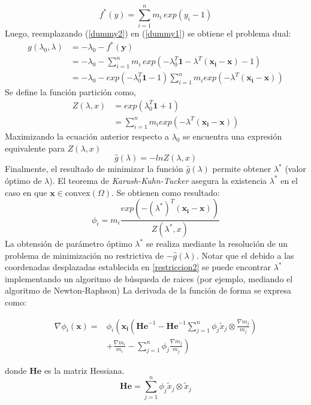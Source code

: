 \begin{equation}
f^*( y ) = \sum_{i=1}^{n} m_i \, exp(y_i-1)
\end{equation}
Luego, reemplazando (\ref{dummy2}) en (\ref{dummy1}) se obtiene el problema dual:
\begin{align}
g(\lambda_0,\lambda) & = -\lambda_0 - f^*(\bm{y}) \\
& = -\lambda_0 -\sum_{i=1}^{n} m_i \, exp(-\lambda_0^T \bm{1} - \lambda^T (\bm{x_i}-\bm{x})-1) \\
& = -\lambda_0 -exp(-\lambda_0^T \bm{1} -1) \sum_{i=1}^{n} m_i exp(-\lambda^T (\bm{x_i}-\bm{x}))
\end{align}
Se define la función partición como,
\begin{align}
Z(\lambda,x) & = exp(\lambda_0^T \bm{1} +1) \\
& = \sum_{i=1}^{n} m_i exp(-\lambda^T (\bm{x_i}-\bm{x}))
\end{align}
Maximizando la ecuación anterior respecto a $\lambda_0$ se encuentra una expresión equivalente para $Z(\lambda,x)$
\begin{equation}
\hat{g}(\lambda) = - lnZ(\lambda,x)
\end{equation}
Finalmente, el resultado de minimizar la función $\hat{g}(\lambda)$ permite obtener $\lambda^*$ (valor óptimo de $\lambda$). El teorema de \textit{Karush-Kuhn-Tucker} \citep{opt-convx} asegura la existencia $\lambda^*$ en el caso en que $\bm{x} \in \mbox{convex}(\Omega)$. Se obtienen como resultado:
\begin{equation}
\phi_i = m_i \frac{exp(-(\lambda^*)^T(\bm{x_i}-\bm{x}))}{Z(\lambda^*,x)}
\end{equation}
La obtensión de parámetro óptimo $\lambda^*$ se realiza mediante la resolución de un problema de minimización no restrictiva de $-\hat{g}(\lambda)$. Notar que el debido a las coordenadas desplazadas establecida en \ref{restriccion2} se puede encontrar $\lambda^*$ implementando un algoritmo de búsqueda de raices (por ejemplo, mediando el algoritmo de Newton-Raphson) \citep{marchant}
La derivada de la función de forma se expresa como:

\begin{footnotesize}
\begin{equation}
\begin{split}
\nabla \phi_i(\bm{x}) = &  \phi_i 
\left(
\bm{x_i} \left( \bm{He}^{-1} - \bm{He}^{-1} \sum_{j=1}^{n} \phi_j \tilde{x}_j \otimes \frac{\nabla m_j}{m_j} \right) \right.\\
&\left. + \frac{\nabla m_i}{m_i} - \sum_{j=1}^{n} \phi_j \frac{\nabla m_j}{m_j}
\right)
\end{split}
\end{equation}
\end{footnotesize}
donde $\bm{He}$ es la matriz Hessiana.
\begin{equation}
\bm{He} = \sum_{j=1}^{n} \phi_j \tilde{x}_j \otimes \tilde{x}_j
\end{equation}
